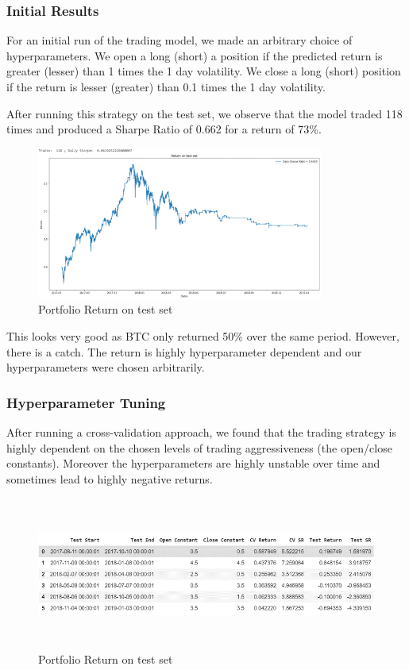 \documentclass{article}
\begin{document}
\subsubsection{Initial Results}

For an initial run of the trading model, we made an arbitrary choice of hyperparameters. We open a long (short) a position if the predicted return is greater (lesser) than 1 times the 1 day volatility. We close a long (short) position if the return is lesser (greater) than 0.1 times the 1 day volatility. 

After running this strategy on the test set, we observe that the model traded 118 times and produced a Sharpe Ratio of 0.662 for a return of 73\%.

\begin{figure}[h]
  \centering
  \includegraphics[width=0.9\linewidth, height=5cm]{Portfolio Return.png}
  \caption{Portfolio Return on test set}
  \label{fig:fig1}
\end{figure}

This looks very good as BTC only returned 50\% over the same period. However, there is a catch. The return is highly hyperparameter dependent and our hyperparameters were chosen arbitrarily.

\subsubsection{Hyperparameter Tuning}

After running a cross-validation approach, we found that the trading strategy is highly dependent on the chosen levels of trading aggressiveness (the open/close constants). Moreover the hyperparameters are highly unstable over time and sometimes lead to highly negative returns.

\begin{figure}[h]
  \centering
  \includegraphics[width=0.9\linewidth, height=5cm]{Hyperparameter Tuning.png}
  \caption{Portfolio Return on test set}
  \label{fig:fig1}
\end{figure}
\end{document}
